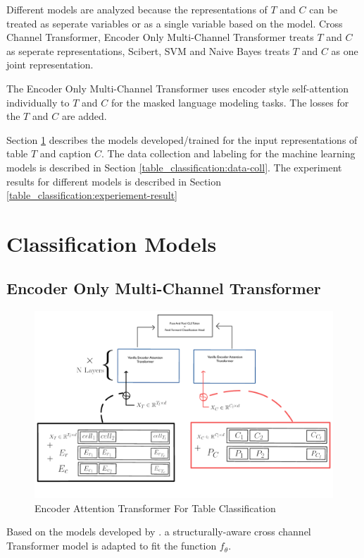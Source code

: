 Different models are analyzed because the representations of $T$ and $C$ can be treated as seperate variables or as a single variable based on the model. Cross Channel Transformer, Encoder Only Multi-Channel Transformer treats $T$ and $C$ as seperate representations, Scibert, SVM and Naive Bayes treats $T$ and $C$ as one joint representation. 

The Encoder Only Multi-Channel Transformer uses encoder style self-attention individually to $T$ and $C$ for the masked language modeling tasks. The losses for the $T$ and $C$ are added. 

Section \ref{table_classification:models} describes the models developed/trained for the input representations of table $T$ and caption $C$. The data collection and labeling for the machine learning models is described in Section \ref{table_classification:data-coll}. The experiment results for different models is described in Section \ref{table_classification:experiement-result}

\section{Classification Models}
\label{table_classification:models}

\subsection{Encoder Only Multi-Channel Transformer}
\label{table_classification:models:encoder-model}
\begin{figure}[h]
    \centering
    \includegraphics[width=\maxwidth{\textwidth}]{src/images/tabmod-enconly.pdf}
    \caption{Encoder Attention Transformer For Table Classification}
    \label{figure\arabic{figurecounter}}
\end{figure}
Based on the models developed by \cite{deng2020turl}. a structurally-aware cross channel Transformer model is adapted to fit the function $f_\theta$.

